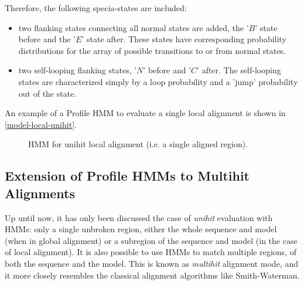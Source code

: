 Therefore, the following specia-states are included:

\begin{itemize}

\item two flanking states connecting all normal states are added, the '$B$' state before and the '$E$' state after. These states have corresponding probability distributions for the array of possible transitions to or from normal states.

\item two self-looping flanking states, '$N$' before and '$C$' after. The self-looping states are characterized simply by a loop probability and a 'jump' probability out of the state.

\end{itemize}

An example of a Profile HMM to evaluate a single local alignment is shown in \autoref{model-local-unihit}.

\begin{figure}[htb!]
  \begin{center}
    \caption[HMM for unihit local alignment] {HMM for unihit local alignment (i.e. a single aligned region). }  
    \label{model-local-unihit}
  \end{center}
\end{figure}



\subsection{Extension of Profile HMMs to Multihit Alignments}

Up until now, it has only been discussed the case of \emph{unihit} evaluation with HMMs: only a single unbroken region, either the whole sequence and model (when in global alignment) or a subregion of the sequence and model (in the case of local alignment). It is also possible to use HMMs to match multiple regions, of both the sequence and the model. This is known as \emph{multihit} alignment mode, and it more closely resembles the classical alignment algorithms like Smith-Waterman. 

